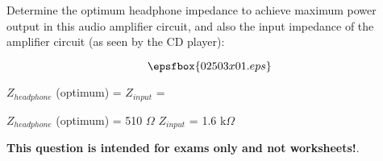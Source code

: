 

Determine the optimum headphone impedance to achieve maximum power output in this audio amplifier circuit, and also the input impedance of the amplifier circuit (as seen by the CD player):

$$\epsfbox{02503x01.eps}$$

$Z_{headphone}$ (optimum) = \hskip 80pt $Z_{input}$ = 







$Z_{headphone}$ (optimum) = 510 $\Omega$ \hskip 50pt $Z_{input}$ = 1.6 k$\Omega$







{\bf This question is intended for exams only and not worksheets!}.




